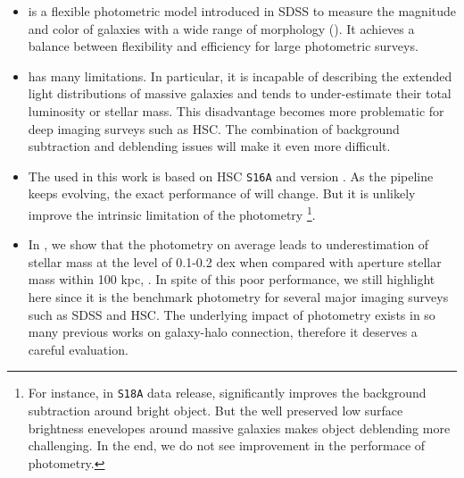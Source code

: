 \documentclass[a4paper,fleqn,usenatbib]{mnras}
\begin{document}

    \begin{itemize}
        
        \item \cmodel{} is a flexible photometric model introduced in SDSS to measure the magnitude
            and color of galaxies with a wide range of morphology (\addref{}).
            It achieves a balance between flexibility and efficiency for large photometric surveys.
        
        \item \cmodel{} has many limitations. In particular, it is incapable of describing the 
            extended light distributions of massive galaxies and tends to under-estimate their
            total luminosity or stellar mass. 
            This disadvantage becomes more problematic for deep imaging surveys such as HSC.
            The combination of background subtraction and deblending issues will make it even more 
            difficult.
        
        \item The \mcmodel{} used in this work is based on HSC \texttt{S16A} and \hscpipe{} 
            version {\color{red}{XXX}}. As the pipeline keeps evolving, the exact performance of 
            \cmodel{} will change. But it is unlikely improve the intrinsic limitation of 
            the \cmodel{} photometry \footnote{
            For instance, in {\tt S18A} data release, \hscpipe{} significantly improves the 
            background subtraction around bright object. But the well preserved low surface 
            brightness enevelopes around massive galaxies makes object deblending more challenging.
            In the end, we do not see improvement in the performace of \cmodel{} photometry. 
            }.
        
        \item In \citet{Huang2018b}, we show that the \cmodel{} photometry on average leads to 
            underestimation of stellar mass at the level of 0.1-0.2 dex when compared with 
            aperture stellar mass within 100 kpc, \mtot{}.
            In spite of this poor performance, we still highlight \cmodel{} here since it is the 
            benchmark photometry for several major imaging surveys such as SDSS and HSC.
            The underlying impact of \cmodel{} photometry exists in so many previous works on 
            galaxy-halo connection, therefore it deserves a careful evaluation.
        
    \end{itemize}
\end{document}
